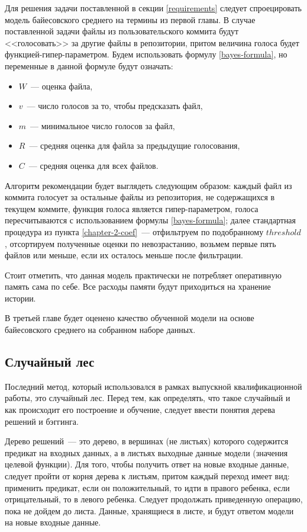 Для решения задачи поставленной в секции \ref{requirements} следует спроецировать модель байесовского среднего на термины из первой главы. В случае поставленной задачи файлы из пользовательского коммита будут <<голосовать>> за другие файлы в репозитории, притом величина голоса будет функцией-гипер-параметром. Будем использовать формулу \ref{bayes-formula}, но переменные в данной формуле будут означать:
\begin{itemize}
    \item $W$~--- оценка файла,
    \item $v$~--- число голосов за то, чтобы предсказать файл,
    \item $m$~--- минимальное число голосов за файл,
    \item $R$~--- средняя оценка для файла за предыдущие голосования,
    \item ${C}$~--- средняя оценка для всех файлов.
\end{itemize}

Алгоритм рекомендации будет выглядеть следующим образом: каждый файл из коммита голосует за остальные файлы из репозитория, не содержащихся в текущем коммите, функция голоса является гипер-параметром, голоса пересчитываются с использованием формулы \ref{bayes-formula}; далее стандартная процедура из пункта \ref{chapter-2-coef}~--- отфильтруем по подобранному $threshold$, отсортируем полученные оценки по невозрастанию, возьмем первые пять файлов или меньше, если их осталось меньше после фильтрации.

Стоит отметить, что данная модель практически не потребляет оперативную память сама по себе. Все расходы памяти будут приходиться на хранение истории.

В третьей главе будет оценено качество обученной модели на основе байесовского среднего на собранном наборе данных.
    \subsection{Случайный лес}\label{chapter2-forest}
Последний метод, который использовался в рамках выпускной квалификационной работы, это случайный лес. Перед тем, как определять, что такое случайный и как происходит его построение и обучение, следует ввести понятия дерева решений и бэггинга.

Дерево решений~--- это дерево, в вершинах (не листьях) которого содержится предикат на входных данных, а в листьях выходные данные модели (значения целевой функции). Для того, чтобы получить ответ на новые входные данные, следует пройти от корня дерева к листьям, притом каждый переход имеет вид: применить предикат, если он положительный, то идти в правого ребенка, если отрицательный, то в левого ребенка. Следует продолжать приведенную операцию, пока не дойдем до листа. Данные, хранящиеся в листе, и будут ответом модели на новые входные данные.


